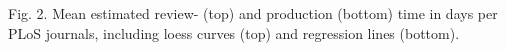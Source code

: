 Fig. 2. Mean estimated review- (top) and production (bottom) time in days per PLoS journals, including loess curves (top) and regression lines (bottom).
